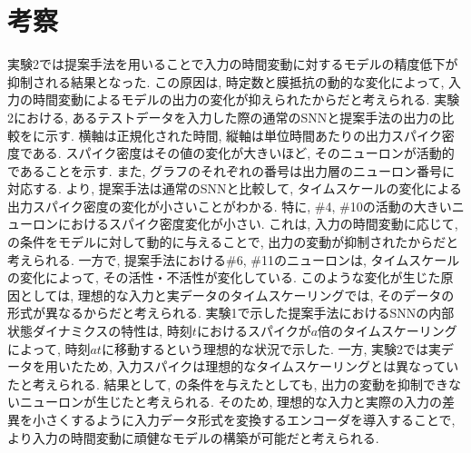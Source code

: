 \section{考察}


実験2では提案手法を用いることで入力の時間変動に対するモデルの精度低下が抑制される結果となった.
この原因は, 時定数と膜抵抗の動的な変化によって, 入力の時間変動によるモデルの出力の変化が抑えられたからだと考えられる.
実験2における, あるテストデータを入力した際の通常のSNNと提案手法の出力の比較をに示す.
横軸は正規化された時間, 縦軸は単位時間あたりの出力スパイク密度である.
スパイク密度はその値の変化が大きいほど, そのニューロンが活動的であることを示す.
また, グラフのそれぞれの番号は出力層のニューロン番号に対応する.
より, 提案手法は通常のSNNと比較して, タイムスケールの変化による出力スパイク密度の変化が小さいことがわかる.
特に, \#4, \#10の活動の大きいニューロンにおけるスパイク密度変化が小さい.
これは, 入力の時間変動に応じて, の条件をモデルに対して動的に与えることで, 出力の変動が抑制されたからだと考えられる.
一方で, 提案手法における\#6, \#11のニューロンは, タイムスケールの変化によって, その活性・不活性が変化している.
このような変化が生じた原因としては, 理想的な入力と実データのタイムスケーリングでは, そのデータの形式が異なるからだと考えられる.
実験1で示した提案手法におけるSNNの内部状態ダイナミクスの特性は, 時刻$t$におけるスパイクが$a$倍のタイムスケーリングによって, 時刻$at$に移動するという理想的な状況で示した.
一方, 実験2では実データを用いたため, 入力スパイクは理想的なタイムスケーリングとは異なっていたと考えられる.
結果として, の条件を与えたとしても, 出力の変動を抑制できないニューロンが生じたと考えられる.
そのため, 理想的な入力と実際の入力の差異を小さくするように入力データ形式を変換するエンコーダを導入することで, より入力の時間変動に頑健なモデルの構築が可能だと考えられる.

% 
% 
% 